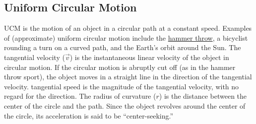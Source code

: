 \documentclass[dvipsnames]{article}
\numberwithin{equation}{section}
\numberwithin{figure}{section}
\begin{document}
\subsection{Uniform Circular Motion} \label{uPOucv}

\Gls{UCM} is the motion of an object in a circular path at a constant speed. Examples of (approximate) uniform circular motion include the \href{https://youtu.be/3NYlYN-QTig}{hammer throw}, a bicyclist rounding a turn on a curved path, and the Earth's orbit around the Sun. The \gls{tangential velocity} ($\vec{v}$) is the instantaneous linear velocity of the object in circular motion. If the circular motion is abruptly cut off (as in the hammer throw sport), the object moves in a straight line in the direction of the tangential velocity. \Gls{tangential speed} is the magnitude of the tangential velocity, with no regard for the direction. The \gls{radius of curvature} ($r$) is the distance between the center of the circle and the path. Since the object revolves around the center of the circle, its acceleration is said to be ``center-seeking.''

\begin{center}
\centering
{}
\end{center}
\end{document}
